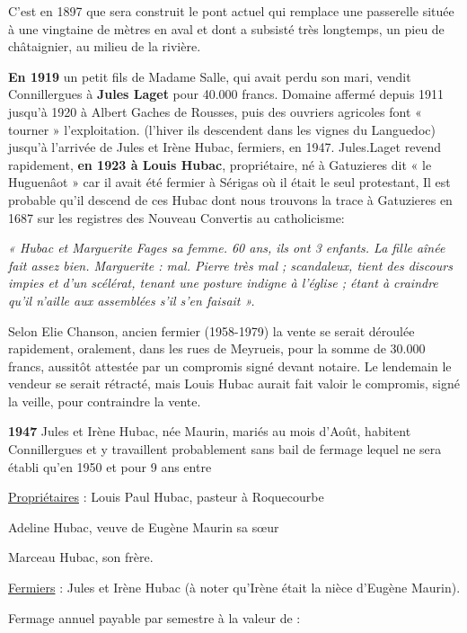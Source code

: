 C’est en 1897 que sera construit le pont actuel qui remplace une passerelle située à une
vingtaine de mètres en aval et dont a subsisté très longtemps, un pieu de châtaignier, au milieu
de la rivière.

\textbf{En 1919} un petit fils de Madame Salle, qui avait perdu son mari, vendit Connillergues à \textbf{Jules
Laget} pour 40.000 francs. Domaine affermé depuis 1911 jusqu’à 1920 à Albert Gaches de
Rousses, puis des ouvriers agricoles font « tourner » l’exploitation. (l’hiver ils descendent
dans les vignes du Languedoc) jusqu’à l’arrivée de Jules et Irène Hubac, fermiers, en 1947.
Jules.Laget revend rapidement, \textbf{en 1923 à Louis Hubac}, propriétaire, né à Gatuzieres dit « le
Huguenâot » car il avait été fermier à Sérigas où il était le seul protestant, Il est probable qu’il
descend de ces Hubac dont nous trouvons la trace à Gatuzieres en 1687 sur les registres des
Nouveau Convertis au catholicisme:

\textit{« Hubac et Marguerite Fages sa femme. 60 ans, ils ont 3 enfants. La fille aînée fait assez bien.
Marguerite : mal. Pierre très mal ; scandaleux, tient des discours impies et d’un scélérat,
tenant une posture indigne à l’église ; étant à craindre qu’il n’aille aux assemblées s’il s’en
faisait ».}

Selon Elie Chanson, ancien fermier (1958-1979) la vente se serait déroulée rapidement,
oralement, dans les rues de Meyrueis, pour la somme de 30.000 francs, aussitôt attestée par un
compromis signé devant notaire. Le lendemain le vendeur se serait rétracté, mais Louis Hubac
aurait fait valoir le compromis, signé la veille, pour contraindre la vente.

\textbf{1947} Jules et Irène Hubac, née Maurin, mariés au mois d’Août, habitent Connillergues et y
travaillent probablement sans bail de fermage lequel ne sera établi qu’en 1950 et pour 9 ans
entre

\underline{Propriétaires} : Louis Paul Hubac, pasteur à Roquecourbe

\hspace{3.5cm} Adeline Hubac, veuve de Eugène Maurin sa sœur

\hspace{3.5cm} Marceau Hubac, son frère.

\underline{Fermiers} : Jules et Irène Hubac (à noter qu’Irène était la nièce d’Eugène Maurin).

\vspace{0.2cm}

Fermage annuel payable par semestre à la valeur de :

